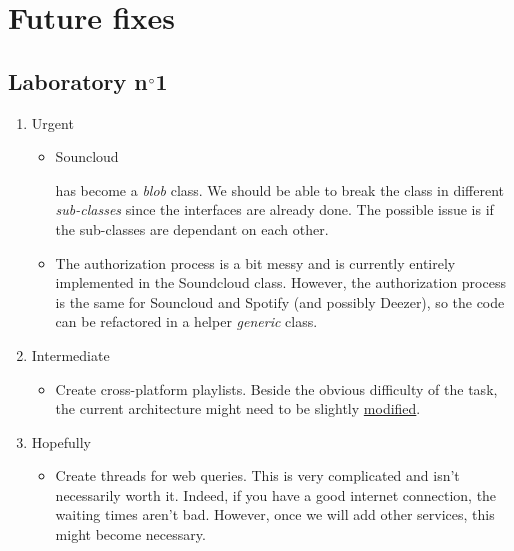 \documentclass{report}
\begin{document}
\chapter{Future fixes}

\section{Laboratory n$\degree$1}
\begin{enumerate}
\item Urgent 
\begin{itemize}
\item \hypertarget{blob}{Souncloud} has become a \textit{blob} class. We should be able to break the class in different \textit{sub-classes} since the interfaces are already done. The possible issue is if the sub-classes are dependant on each other.
\item The authorization process is a bit messy and is currently entirely implemented in the Soundcloud class. However, the authorization process is the same for Souncloud and Spotify (and possibly Deezer), so the code can be refactored in a helper \textit{generic} class.
\end{itemize}
\item Intermediate
\begin{itemize}
\item Create cross-platform playlists. Beside the obvious difficulty of the task, the current architecture might need to be slightly \hyperlink{db}{modified}.
\end{itemize}
\item Hopefully
\begin{itemize}
\item Create threads for web queries. This is very complicated and isn't necessarily worth it. Indeed, if you have a good internet connection, the waiting times aren't bad. However, once we will add other services, this might become necessary.
\end{itemize}
\end{enumerate}

\end{document}
